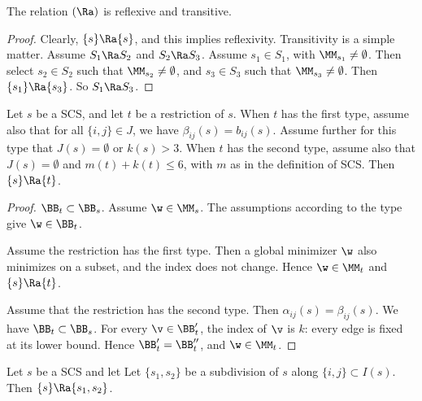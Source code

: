 \begin{lemma}
The relation $(\Ra)$  is reflexive and transitive.
\end{lemma}

\begin{proof}  Clearly, $\{s \}\Ra \{s\}$, and this implies reflexivity.
Transitivity is a simple matter.  Assume
$S_1\Ra S_2$ and $S_2\Ra S_3$.  Assume $s_1\in S_1$, with $\MM_{s_1}\ne \emptyset$.
Then select
$s_2\in S_2$ such that $\MM_{s_2}\ne\emptyset$, and $s_3\in S_3$ such
that $\MM_{s_3}\ne\emptyset$.  Then $\{s_1\}\Ra\{s_3\}$.  So $S_1\Ra S_3$.
\end{proof}



\begin{lemma}[restriction]
Let $s$ be a SCS, and let $t$ be a restriction of $s$.
When $t$ has the first type, assume also that for all $\{ i , j\} \in J$, we have $\beta_{i j}(s) = b_{i j}(s)$.
Assume further for this type that $J(s)=\emptyset$ or $k(s)>3$.
When $t$ has the second type, assume also that $J(s)=\emptyset$ and $m(t)+k(t)\le 6$, with $m$ as in
the definition of SCS.
Then $\{s\}\Ra \{t\}$.
\end{lemma}

\begin{proof}
$\BB_t\subset \BB_s$. Assume
 $\w\in \MM_s$. The assumptions  according to the type give $\w\in \BB_t$.

Assume the restriction has the first type.  Then a global minimizer $\w$ also
minimizes on a subset,  and the index does not change.  Hence $\w\in \MM_t$ and $\{s\}\Ra\{t\}$.

Assume that the restriction has the second type. Then 
 $\alpha_{ij}(s)=\beta_{ij}(s)$.    We have $\BB_t\subset \BB_s$.
For every $\v\in \BB'_t$, the index of $\v$ is $k$: every edge is fixed at its lower bound.
Hence $\BB'_t = \BB''_t$, and $\w\in \MM_t$.
\end{proof}


\begin{lemma}[subdivision]
Let $s$ be a SCS and let
Let $\{s_1,s_2\}$ be a subdivision of $s$ along $\{i,j\}\subset I(s)$.
Then $\{s\}\Ra\{s_1,s_2\}$.
\end{lemma}

